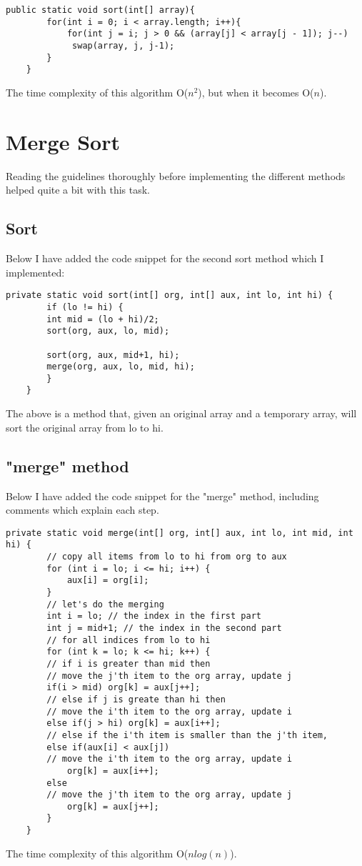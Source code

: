 \documentclass[a4paper,11pt]{article}
\begin{document}
\begin{verbatim}
public static void sort(int[] array){
        for(int i = 0; i < array.length; i++){
            for(int j = i; j > 0 && (array[j] < array[j - 1]); j--)
             swap(array, j, j-1);
        }
    }
\end{verbatim}
The time complexity of this algorithm O($n^{2}$), but when it becomes O($n$).



\section*{Merge Sort}

Reading the guidelines thoroughly before implementing the different methods helped quite a bit with this task.

\subsection*{Sort}
Below I have added the code snippet for the second sort method which I implemented:
 
 \begin{verbatim}
private static void sort(int[] org, int[] aux, int lo, int hi) {
        if (lo != hi) {
        int mid = (lo + hi)/2;
        sort(org, aux, lo, mid);

        sort(org, aux, mid+1, hi);
        merge(org, aux, lo, mid, hi);
        }
    }
\end{verbatim}
The above is a method that, given an original array and a temporary array, will sort the
original array from lo to hi.

\subsection*{"merge" method}
Below I have added the code snippet for the "merge" method, including comments which explain each step.
 
 \begin{verbatim}
private static void merge(int[] org, int[] aux, int lo, int mid, int hi) {
        // copy all items from lo to hi from org to aux
        for (int i = lo; i <= hi; i++) {
            aux[i] = org[i];
        }
        // let's do the merging
        int i = lo; // the index in the first part
        int j = mid+1; // the index in the second part
        // for all indices from lo to hi
        for (int k = lo; k <= hi; k++) {
        // if i is greater than mid then
        // move the j'th item to the org array, update j
        if(i > mid) org[k] = aux[j++];
        // else if j is greate than hi then
        // move the i'th item to the org array, update i
        else if(j > hi) org[k] = aux[i++];
        // else if the i'th item is smaller than the j'th item,
        else if(aux[i] < aux[j])
        // move the i'th item to the org array, update i
            org[k] = aux[i++];
        else
        // move the j'th item to the org array, update j
            org[k] = aux[j++];
        }
    }
\end{verbatim}
The time complexity of this algorithm O($nlog(n)$).
\end{document}
